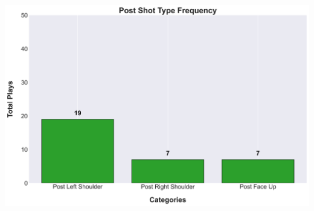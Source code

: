 \documentclass[a4paper,12pt]{article}
\begin{document}
\begin{table}[H]
{\begin{minipage}[t]{0.6\textwidth}
{\begin{tabular}
            \bottomrule
        \end{tabular}
        } %
    \end{minipage}
    } %
    \hfill
    \begin{minipage}[c]{0.35\textwidth} %
        \flushright
        \includegraphics[width=\textwidth, height=.14\textheight]{images/Post_ShotType_Freq.png} %
    \end{minipage}
    
\end{table}

\vspace{-1em} %
\vspace{-1em} %
\end{document}
